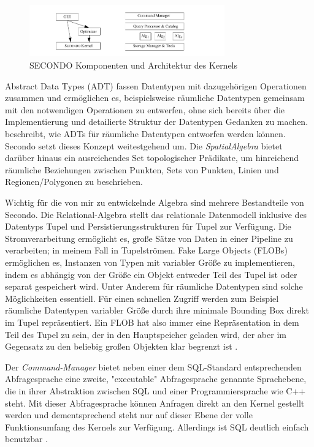 \documentclass[a4paper,12pt,twoside]{article}
\newcommand{\Fb}[1]{\textit{#1}} %
\begin{document}
\begin{figure}
	\centering
	\includegraphics[width=0.75\textwidth]{Bilder/secondo.png}
	\caption{SECONDO Komponenten und Architektur des Kernels \autocite{Gueting2010}}
	\label{img:secondo}
\end{figure}

Abstract Data Types (ADT) fassen Datentypen mit dazugehörigen Operationen zusammen und ermöglichen es, beispielsweise räumliche Datentypen gemeinsam mit den notwendigen Operationen zu entwerfen, ohne sich bereits über die Implementierung und detailierte Struktur der Datentypen Gedanken zu machen. {\textcite[S. 75ff]{Rigaux2001}} beschreibt, wie ADTs für räumliche Datentypen entworfen werden können. Secondo setzt dieses Konzept weitestgehend um. Die \Fb{SpatialAlgebra} bietet darüber hinaus ein ausreichendes Set topologischer Prädikate, um hinreichend räumliche Beziehungen zwischen Punkten, Sets von Punkten, Linien und Regionen/Polygonen zu beschrieben.

Wichtig für die von mir zu entwickelnde Algebra sind mehrere Bestandteile von Secondo. Die Relational-Algebra stellt das relationale Datenmodell inklusive des Datentyps Tupel und Persistierungsstrukturen für Tupel zur Verfügung. Die Stromverarbeitung ermöglicht es, große Sätze von Daten in einer Pipeline zu verarbeiten; in meinem Fall in Tupelströmen. Fake Large Objects (FLOBs) ermöglichen es, Instanzen von Typen mit variabler Größe zu implementieren, indem es abhängig von der Größe ein Objekt entweder Teil des Tupel ist oder separat gespeichert wird. Unter Anderem für räumliche Datentypen sind solche Möglichkeiten essentiell. Für einen schnellen Zugriff werden zum Beispiel räumliche Datentypen variabler Größe durch ihre minimale Bounding Box direkt im Tupel repräsentiert. Ein FLOB hat also immer eine Repräsentation in dem Teil des Tupel zu sein, der in den Hauptspeicher geladen wird, der aber im Gegensatz zu den beliebig großen Objekten klar begrenzt ist \autocite{Gueting2010}.

Der \Fb{Command-Manager} bietet neben einer dem SQL-Standard entsprechenden Abfragesprache eine zweite, "executable" Abfragesprache genannte Sprachebene, die in ihrer Abstraktion zwischen SQL und einer Programmiersprache wie C++ steht. Mit dieser Abfragesprache können Anfragen direkt an den Kernel gestellt werden und dementsprechend steht nur auf dieser Ebene der volle Funktionsumfang des Kernels zur Verfügung. Allerdings ist SQL deutlich einfach benutzbar \autocite{Gueting2010}. 
\end{document}

